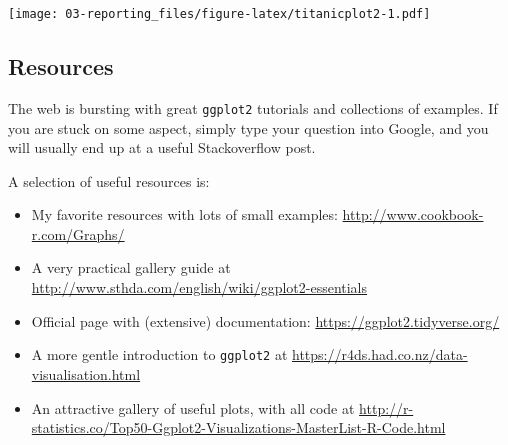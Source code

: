 \documentclass[]{book}
\newenvironment{Shaded}{\begin{snugshade}}{\end{snugshade}}
\newcommand{\CommentTok}[1]{\textcolor[rgb]{0.56,0.35,0.01}{\textit{#1}}}
\newcommand{\DataTypeTok}[1]{\textcolor[rgb]{0.13,0.29,0.53}{#1}}
\newcommand{\KeywordTok}[1]{\textcolor[rgb]{0.13,0.29,0.53}{\textbf{#1}}}
\newcommand{\NormalTok}[1]{#1}
\newcommand{\OperatorTok}[1]{\textcolor[rgb]{0.81,0.36,0.00}{\textbf{#1}}}
\newcommand{\StringTok}[1]{\textcolor[rgb]{0.31,0.60,0.02}{#1}}
\providecommand{\tightlist}{%
  \setlength{\itemsep}{0pt}\setlength{\parskip}{0pt}}
\begin{document}
\begin{Shaded}
\end{Shaded}

\texttt{[image: 03-reporting\_files/figure-latex/titanicplot2-1.pdf]}

\hypertarget{ggplotresources}{%
\subsection{Resources}\label{ggplotresources}}

The web is bursting with great \texttt{ggplot2} tutorials and collections of examples. If you are stuck on some aspect, simply type your question into Google, and you will usually end up at a useful Stackoverflow post.

A selection of useful resources is:

\begin{itemize}
\tightlist
\item
  My favorite resources with lots of small examples: \url{http://www.cookbook-r.com/Graphs/}
\item
  A very practical gallery guide at \url{http://www.sthda.com/english/wiki/ggplot2-essentials}
\item
  Official page with (extensive) documentation: \url{https://ggplot2.tidyverse.org/}
\item
  A more gentle introduction to \texttt{ggplot2} at \url{https://r4ds.had.co.nz/data-visualisation.html}
\item
  An attractive gallery of useful plots, with all code at \url{http://r-statistics.co/Top50-Ggplot2-Visualizations-MasterList-R-Code.html}
\end{itemize}
\end{document}
